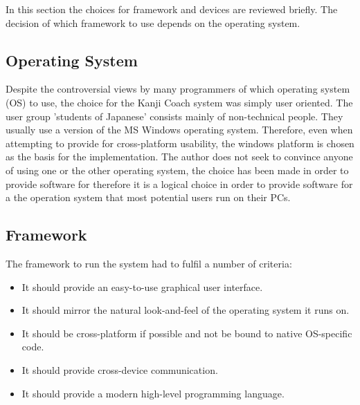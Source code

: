 In this section the choices for framework and devices are reviewed briefly.
The decision of which framework to use depends on the operating system.

\subsection{Operating System}
\label{sec:operatingsystem}

Despite the controversial views by many programmers of which operating 
system (OS) to use, the choice for the Kanji Coach system was simply user oriented. 
The user group 'students of Japanese' consists mainly of non-technical people. 
They usually use a version of the MS Windows operating system. Therefore, even 
when attempting to provide for cross-platform usability, 
the windows platform is chosen as the basis for the implementation. 
The author does not seek to convince anyone of using one 
or the other operating system, the choice has been made in order to provide
software for therefore it is a logical choice in order to provide 
software for a the operation system that most potential users run on their PCs.

\subsection{Framework}
\label{sec:framework}

The framework to run the system had to fulfil a number of criteria:
\begin{itemize}

  \item It should provide an easy-to-use graphical user interface.

  \item It should mirror the natural look-and-feel of the operating system 
        it runs on.

  \item It should be cross-platform if possible and not be bound to native
        OS-specific code.

  \item It should provide cross-device communication.

  \item It should provide a modern high-level programming language.

\end{itemize}

